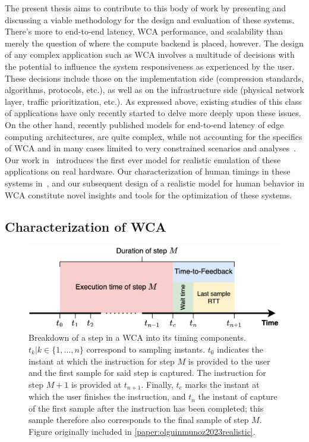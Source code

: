 The present thesis aims to contribute to this body of work by presenting and discussing a viable methodology for the design and evaluation of these systems.
There's more to end-to-end latency, \gls{WCA} performance, and scalability than merely the question of where the compute backend is placed, however.
The design of any complex application such as \gls{WCA} involves a multitude of decisions with the potential to influence the system responsiveness as experienced by the user.
These decisions include those on the implementation side (compression standards, algorithms, protocols, etc.), as well as on the infrastructure side (physical network layer, traffic prioritization, etc.).
As expressed above, existing studies of this class of applications have only recently started to delve more deeply upon these issues.
On the other hand, recently published models for end-to-end latency of edge computing architectures, are quite complex, while not accounting for the specifics of \gls{WCA} and in many cases limited to very constrained scenarios and analyses~\cite{al_zubaidy2015performance,schiessl2017finite}.
Our work in~\cite{olguinmunoz2018demoscaling,olguinmunoz2019edgedroid} introduces the first ever model for realistic emulation of these applications on real hardware.
Our characterization of human timings in these systems in~\cite{olguinmunoz2021impact}, and our subsequent design of a realistic model for human behavior in \gls{WCA} constitute novel insights and tools for the optimization of these systems.

\subsection{Characterization of \acs{WCA}}

\begin{figure}
    \centering
    \includegraphics[width=.9\textwidth]{publications/2023EdgeDroid2/figs/step_time}
    \caption[]{%
        Breakdown of a step in a \gls{WCA} into its timing components.
        \ensuremath{t_k | k \in \{1, \ldots, n \}} correspond to sampling instants.
        \ensuremath{t_0} indicates the instant at which the instruction for step \ensuremath{M} is provided to the user and the first sample for said step is captured.
        The instruction for step \ensuremath{M + 1} is provided at \ensuremath{t_{n+1}}.
        Finally, \ensuremath{t_c} marks the instant at which the user finishes the instruction, and \ensuremath{t_n} the instant of capture of the first sample after the instruction has been completed;
        this sample therefore also corresponds to the final sample of step \ensuremath{M}.
        Figure originally included in \cref{paper:olguinmunoz2023realistic}.
    }\label{fig:wcastep}
\end{figure}

